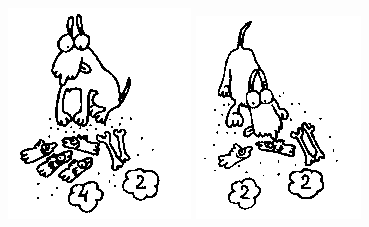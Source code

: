 \begin{figure}[H]
\begin{minipage}{0.25\linewidth}
    \includegraphics[width=0.95\columnwidth]{img/11.2 img4.png}
    \includegraphics[width=0.95\columnwidth]{img/11.2 img5.png}
\end{minipage}
\end{figure}

